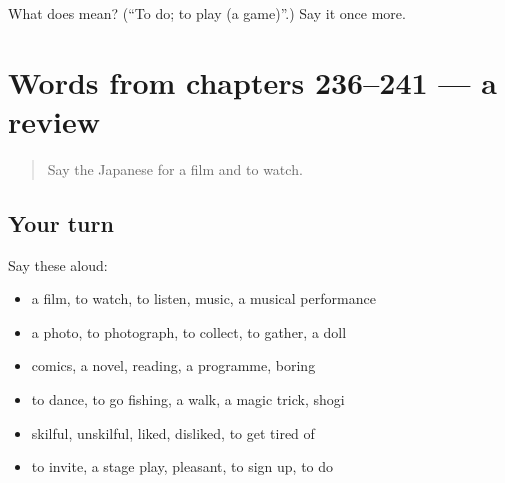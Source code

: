\begin{tcolorbox}[breakable,colback=teal!4,colframe=teal!35!black,title={Before you move on}]
What does  mean? (\textquotedblleft{}To do; to play (a game)\textquotedblright{}.) Say it once more.
\end{tcolorbox}
\section[(dialogue)]{Words from chapters 236–241 — a review}

\label{lesson:JA-R241-review-236-241}



\begin{quote}
Say the Japanese for a film and to watch.
\end{quote}

\subsection*{Your turn}
Say these aloud:

\begin{itemize}
\raggedright
  \item a film, to watch, to listen, music, a musical performance
  \item a photo, to photograph, to collect, to gather, a doll
  \item comics, a novel, reading, a programme, boring
  \item to dance, to go fishing, a walk, a magic trick, shogi
  \item skilful, unskilful, liked, disliked, to get tired of
  \item to invite, a stage play, pleasant, to sign up, to do
\end{itemize}

